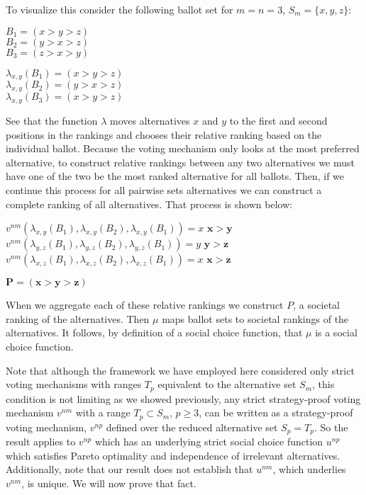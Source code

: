 \documentclass{amsart}
\theoremstyle{plain}
\begin{document}
\noindent To visualize this consider the following ballot set for $m = n = 3$, $S_m = \{x, y , z\}$:
\begin{center}
\begin{multicols}{2}
\noindent $B_1 = (x > y > z)$ \\
$B_2 = (y > x > z)$ \\
$B_3 = (z > x > y)$

\noindent $\lambda_{x,y}(B_1) = (x > y > z)$ \\
$\lambda_{x,y}(B_2) = (y > x > z)$ \\
$\lambda_{x,y}(B_3) = (x > y > z)$ \\
\end{multicols}
\end{center}

\noindent See that the function $\lambda$ moves alternatives $x$ and $y$ to the first and second positions in the rankings and chooses their relative ranking based on the individual ballot. Because the voting mechanism only looks at the most preferred alternative, to construct relative rankings between any two alternatives we must have one of the two be the most ranked alternative for all ballots. Then, if we continue this process for all pairwise sets alternatives we can construct a complete ranking of all alternatives. That process is shown below:

\vskip 0.25cm

\begin{center}
    $v^{nm}(\lambda_{x,y}(B_1), \lambda_{x,y}(B_2), \lambda_{x,y}(B_1)) = x$ \flushright $\mathbf{x > y}$ \\
    \center $v^{nm}(\lambda_{y,z}(B_1), \lambda_{y,z}(B_2), \lambda_{y,z}(B_1)) = y$ \flushright $\mathbf{y > z}$ \\
    \center $v^{nm}(\lambda_{x,z}(B_1), \lambda_{x,z}(B_2), \lambda_{x,z}(B_1)) = x$ \flushright $\mathbf{x > z}$ 

    \vskip 0.5cm

    \center $\mathbf{P = (x > y > z)}$

    \vskip 0.25cm
\end{center}

\noindent When we aggregate each of these relative rankings we construct $P$, a societal ranking of the alternatives. Then $\mu$ maps ballot sets to societal rankings of the alternatives. It follows, by definition of a social choice function, that $\mu$ is a social choice function.

Note that although the framework we have employed here considered only strict voting mechanisms with ranges $T_p$ equivalent to the alternative set $S_m$, this condition is not limiting as we showed previously, any strict strategy-proof voting mechanism $v^{nm}$ with a range $T_p \subset S_m$, $p \ge 3$, can be written as a strategy-proof voting mechanism, $v^{np}$ defined over the reduced alternative set $S_p = T_p$. So the result applies to $v^{np}$ which has an underlying strict social choice function $u^{np}$ which satisfies Pareto optimality and independence of irrelevant alternatives. Additionally, note that our result does not establish that $u^{nm}$, which underlies $v^{nm}$, is unique. We will now prove that fact.
\end{document}
